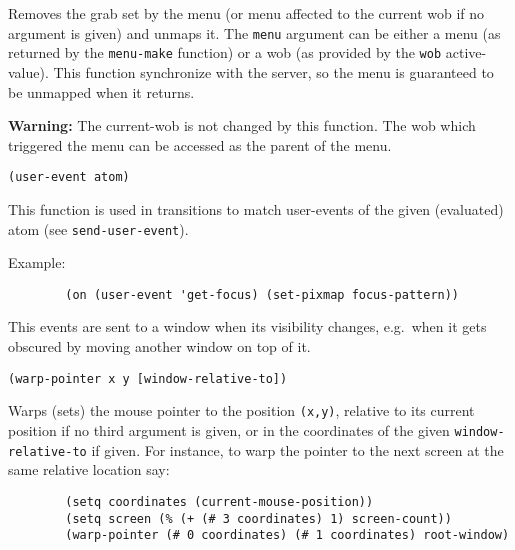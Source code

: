 Removes the grab set by the menu (or menu affected to the current wob if no
argument is given) and unmaps it. The {\tt menu} argument can be either a
menu (as returned by the \verb"menu-make" function) or a wob (as provided by
the \verb"wob" active-value). This function synchronize {\GWM} with the
server, so the menu is guaranteed to be unmapped when it returns.

{\bf Warning:} The current-wob is not changed by this function. The wob
which triggered the menu can be accessed as the parent of the menu.

        
{\usagefont\begin{verbatim}
(user-event atom)
\end{verbatim}}\usageupspace

This function is used in transitions to match user-events of the given
(evaluated) atom (see \verb"send-user-event").

Example:
{\exemplefont\upspace\begin{verbatim}
        (on (user-event 'get-focus) (set-pixmap focus-pattern))
\end{verbatim}}



This events are sent to a window when its visibility changes, e.g.\ 
when it gets obscured by moving another window on top of it.


{\usagefont\begin{verbatim}
(warp-pointer x y [window-relative-to])
\end{verbatim}}\usageupspace

Warps (sets) the mouse pointer to the position \verb"(x,y)", relative to
its current position if no third argument is given, or in the
coordinates of the given \verb"window-relative-to" if given.
For instance, to warp the pointer to the next screen at the same relative
location say:

{\exemplefont\begin{verbatim}
        (setq coordinates (current-mouse-position))
        (setq screen (% (+ (# 3 coordinates) 1) screen-count))
        (warp-pointer (# 0 coordinates) (# 1 coordinates) root-window)
\end{verbatim}}

